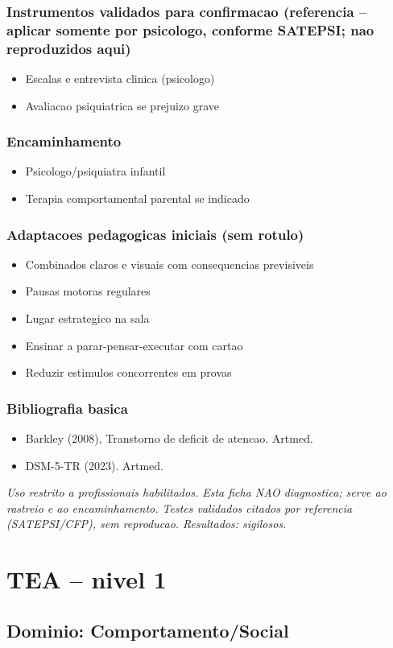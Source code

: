 \documentclass[a4paper,11pt]{book}
\newcommand{\avisolegal}{\par\medskip\noindent\footnotesize\itshape
\color{cinza}Uso restrito a profissionais habilitados. Esta ficha NAO diagnostica;
serve ao rastreio e ao encaminhamento. Testes validados citados por referencia
(SATEPSI/CFP), sem reproducao. Resultados: sigilosos.\color{black}\par}
\begin{document}
\subsection*{Instrumentos validados para confirmacao (referencia -- aplicar somente por psicologo, conforme SATEPSI; nao reproduzidos aqui)}
\begin{itemize}
\item Escalas e entrevista clinica (psicologo)
\item Avaliacao psiquiatrica se prejuizo grave
\end{itemize}
\subsection*{Encaminhamento}
\begin{itemize}
\item Psicologo/psiquiatra infantil
\item Terapia comportamental parental se indicado
\end{itemize}
\subsection*{Adaptacoes pedagogicas iniciais (sem rotulo)}
\begin{itemize}
\item Combinados claros e visuais com consequencias previsiveis
\item Pausas motoras regulares
\item Lugar estrategico na sala
\item Ensinar a parar-pensar-executar com cartao
\item Reduzir estimulos concorrentes em provas
\end{itemize}
\subsection*{Bibliografia basica}
\begin{itemize}
\item Barkley (2008), Transtorno de deficit de atencao. Artmed.
\item DSM-5-TR (2023). Artmed.
\end{itemize}
\avisolegal


\chapter{TEA -- nivel 1}
\section*{Dominio: Comportamento/Social}
\end{document}
